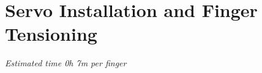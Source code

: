 
\chapter{Servo Installation and Finger Tensioning}  %

\label{Servo Installation and Finger Tensioning} 
%
%

\textit{Estimated time 0h 7m per finger}
